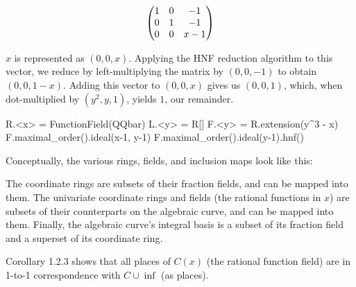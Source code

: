 \begin{example}
\[
\left(\begin{matrix}
 1 & 0 & -1 \cr
 0 & 1 & -1 \cr
 0 & 0 & x-1 \cr
\end{matrix}\right)
\]

$x$ is represented as $(0,0,x)$.  Applying the HNF reduction algorithm
to this vector, we reduce by left-multiplying
the matrix by $(0,0,-1)$ to obtain $(0,0,1-x)$.
Adding
this vector to $(0,0,x)$ gives us $(0,0,1)$,
which, when dot-multiplied by $(y^2,y,1)$, yields $1$, our remainder.

\begin{sageblock}[ch7-hnf]
R.<x> = FunctionField(QQbar)
L.<y> = R[]
F.<y> = R.extension(y^3 - x)
F.maximal_order().ideal(x-1, y-1)
F.maximal_order().ideal(y-1).hnf()
\end{sageblock}

\end{example}

Conceptually, the various rings, fields, and inclusion maps look like this:

\begin{center}
\end{center}

The coordinate rings are subsets of their fraction fields, and can be mapped into them.
The univariate coordinate rings and fields (the rational functions in $x$) are subsets of their
counterparts on the algebraic curve, and can be mapped into them.  Finally, the algebraic
curve's integral basis is a subset of its fraction field and a superset of its coordinate ring.

\cite{Stichtenoth} Corollary 1.2.3 shows that
all places of $C(x)$ (the rational function field) are in 1-to-1 correspondence with $C \cup \inf$ (as places).

